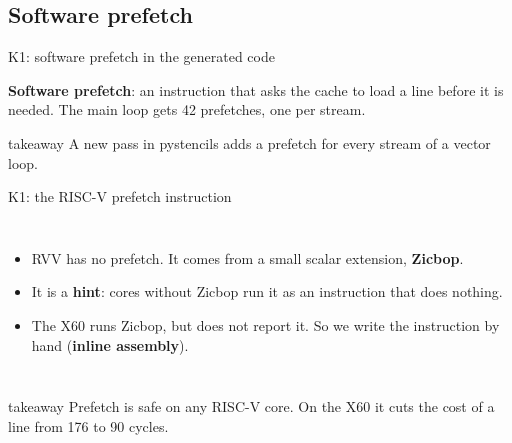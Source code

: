 \documentclass[aspectratio=169,10pt,t]{beamer}
\newcommand{\term}[1]{\textcolor{psblue!85!black}{\textbf{#1}}} %
\newcommand{\takeaway}[1]{\par\vfill
  \begin{beamercolorbox}[wd=\textwidth,sep=4pt,rounded=true]{takeaway}
    \small #1
  \end{beamercolorbox}}
\begin{document}
\subsection{Software prefetch}
\begin{frame}{K1: software prefetch in the generated code}
  \vspace{-1mm}
  \centering

  \vspace{0.5mm}
  {\scriptsize\color{psgray}\term{Software prefetch}: an instruction that asks the cache to load a line before it
  is needed. The main loop gets 42 prefetches, one per stream.\par}
  \takeaway{A new pass in pystencils adds a prefetch for every stream of a vector loop.}
\end{frame}

\begin{frame}{K1: the RISC-V prefetch instruction}
  \begin{columns}[T,onlytextwidth]
    
    \vspace{1mm}
    \begin{itemize}\small
      \item RVV has no prefetch. It comes from a small scalar extension, \term{Zicbop}.
      \item It is a \term{hint}: cores without Zicbop run it as an instruction that does nothing.
      \item The X60 runs Zicbop, but does not report it. So we write the instruction by hand
            (\term{inline assembly}).
    \end{itemize}
  \end{columns}
  \takeaway{Prefetch is safe on any RISC-V core. On the X60 it cuts the cost of a line from 176 to 90 cycles.}
\end{frame}
\end{document}
